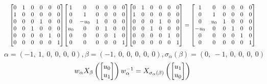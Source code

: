 \documentclass[11pt]{article}
\theoremstyle{definition}
\begin{document}
\[
\scaletoalign{\textwidth}{{\left[\begin{matrix}0 & 1 & 0 & 0 & 0 & 0\\1 & 0 & 0 & 0 & 0 & 0\\0 & 0 & 0 & 1 & 0 & 0\\0 & 0 & 1 & 0 & 0 & 0\\0 & 0 & 0 & 0 & 1 & 0\\0 & 0 & 0 & 0 & 0 & 1\end{matrix}\right]} {\left[\begin{matrix}1 & 0 & 0 & 0 & 0 & 0\\0 & 1 & 0 & 0 & 0 & 0\\0 & - u_{0} & 1 & 0 & 0 & 0\\u_{0} & 0 & 0 & 1 & 0 & 0\\0 & 0 & 0 & 0 & 1 & 0\\0 & 0 & 0 & 0 & 0 & 1\end{matrix}\right]} {\left[\begin{matrix}0 & 1 & 0 & 0 & 0 & 0\\1 & 0 & 0 & 0 & 0 & 0\\0 & 0 & 0 & 1 & 0 & 0\\0 & 0 & 1 & 0 & 0 & 0\\0 & 0 & 0 & 0 & 1 & 0\\0 & 0 & 0 & 0 & 0 & 1\end{matrix}\right]} = {\left[\begin{matrix}1 & 0 & 0 & 0 & 0 & 0\\0 & 1 & 0 & 0 & 0 & 0\\0 & u_{0} & 1 & 0 & 0 & 0\\- u_{0} & 0 & 0 & 1 & 0 & 0\\0 & 0 & 0 & 0 & 1 & 0\\0 & 0 & 0 & 0 & 0 & 1\end{matrix}\right]}}
\]
\[
\alpha = \left( -1, \  1, \  0, \  0, \  0, \  0\right), \beta = \left( -1, \  0, \  0, \  0, \  0, \  0\right), \sigma_{\alpha}(\beta) = \left( 0, \  -1, \  0, \  0, \  0, \  0\right)
\]
\[
\scaletoalign{\textwidth}{w_{\alpha} X_{\beta}\left(\left[\begin{matrix}u_{0}\\u_{1}\end{matrix}\right]\right) w_{\alpha}^{-1} = X_{\sigma_{\alpha}\left(\beta\right)}\left(\left[\begin{matrix}u_{1}\\u_{0}\end{matrix}\right]\right)}
\]
\end{document}
